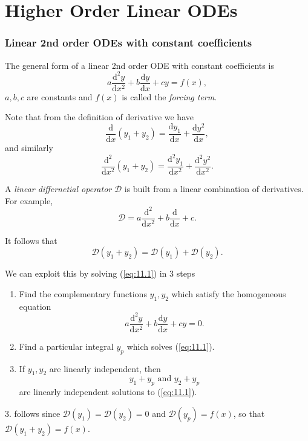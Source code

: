 \documentclass[10pt]{article}
\begin{document}
    \part{Higher Order Linear ODEs}
    \section{Linear 2nd order ODEs with constant coefficients}
    The general form of a linear 2nd order ODE with constant coefficients is 
    \begin{equation}\label{eq:11.1}
        a \frac{\mathrm{d}^2y}{\mathrm{d}x^2}+b \frac{\mathrm{d}y}{\mathrm{d}x}+cy = f(x),
    \end{equation}
    $a,b,c$ are constants and $f(x)$ is called the \textit{forcing term}.

    Note that from the definition of derivative we have 
    \[
        \frac{\mathrm{d}}{\mathrm{d}x}(y_1+y_2)=\frac{\mathrm{d}y_1}{\mathrm{d}x}+\frac{\mathrm{d}y^2}{\mathrm{d}x},   
    \]
    and similarly
    \[
        \frac{\mathrm{d}^2}{\mathrm{d}x^2}(y_1+y_2)=\frac{\mathrm{d}^2y_1}{\mathrm{d}x^2}+\frac{\mathrm{d}^2y^2}{\mathrm{d}x^2}
    .\]

    \begin{definition}
        A \textit{linear differnetial operator} $ \mathcal{D} $ is built from a linear combination of derivatives. For example,
    \[
        \mathcal{D} = a\frac{\mathrm{d}^2}{\mathrm{d}x^2}+b \frac{\mathrm{d}}{\mathrm{d}x}+c.
    \]
    \end{definition}
    It follows that 
    \[
        \mathcal{D}(y_1+y_2)=\mathcal{D}(y_1)+\mathcal{D}(y_2)
    .\]

    We can exploit this by solving (\ref{eq:11.1}) in 3 steps
    \begin{enumerate}
        \item Find the complementary functions $y_1,y_2$ which satisfy the homogeneous equation
        \begin{equation}\label{eq:11.2}
            a \frac{\mathrm{d}^2y}{\mathrm{d}x^2}+b \frac{\mathrm{d}y}{\mathrm{d}x}+cy = 0.
        \end{equation}
        \item Find a particular integral $y_p$ which solves (\ref{eq:11.1}).
        \item If $y_1,y_2$ are linearly independent, then 
        \[y_1+y_p\text{ and }y_2+y_p\]
        are linearly independent solutions to (\ref{eq:11.1}).
    \end{enumerate}
    3. follows since $ \mathcal{D}(y_1)=\mathcal{D}(y_2)=0 $ and $ \mathcal{D}(y_p)=f(x) $, so that $ \mathcal{D}(y_1+y_2)=f(x) $.
\end{document}
